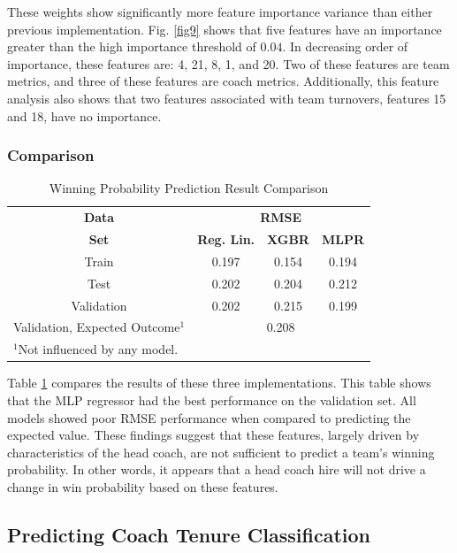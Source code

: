 \documentclass[conference]{IEEEtran}
\begin{document}
These weights show significantly more feature importance variance than either previous implementation. Fig. \ref{fig9} shows that five features have an importance greater than the high importance threshold of $0.04$. In decreasing order of importance, these features are: 4, 21, 8, 1, and 20. Two of these features are team metrics, and three of these features are coach metrics. Additionally, this feature analysis also shows that two features associated with team turnovers, features 15 and 18, have no importance.

\subsubsection{Comparison}

\begin{table}[htbp]
\caption{Winning Probability Prediction Result Comparison}
\begin{center}
\begin{tabular}{|c||c|c|c|}
\hline
\textbf{Data} & \multicolumn{3}{|c|}{\textbf{RMSE}}\\
\cline{2-4} 
\textbf{Set} & \textbf{Reg. Lin.} &  \textbf{XGBR} &  \textbf{MLPR} \\
\hline
\hline
Train & 0.197 & 0.154 & 0.194\\
\hline
Test & 0.202 & 0.204 & 0.212 \\
\hline
Validation & 0.202 & 0.215 & 0.199 \\
\hline
Validation, Expected Outcome$^{\mathrm{1}}$ & \multicolumn{3}{|c|}{0.208} \\
\hline
\multicolumn{2}{l}{$^{\mathrm{1}}$Not influenced by any model.}
\end{tabular}
\label{cum1}
\end{center}
\end{table}

Table \ref{cum1} compares the results of these three implementations. This table shows that the MLP regressor had the best performance on the validation set. All models showed poor RMSE performance when compared to predicting the expected value. These findings suggest that these features, largely driven by characteristics of the head coach, are not sufficient to predict a team's winning probability. In other words, it appears that a head coach hire will not drive a change in win probability based on these features.

\subsection{Predicting Coach Tenure Classification}
\end{document}
